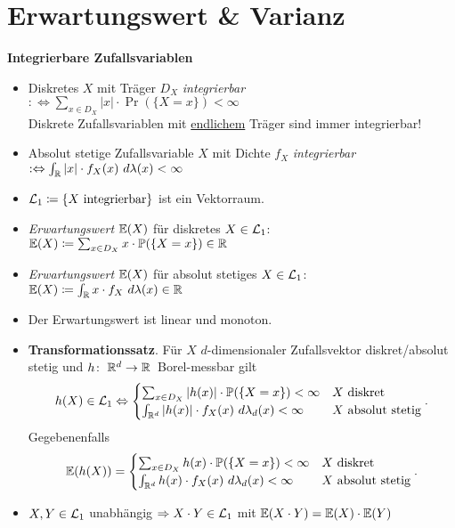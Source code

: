 \section{Erwartungswert \& Varianz}

\textbf{Integrierbare Zufallsvariablen}
\begin{itemize}
\item Diskretes $X$ mit Träger $D_X$ \textit{integrierbar}
  $:\Leftrightarrow \sum_{x \in D_X} |x| \cdot \Pr(\{X=x\}) < \infty$ \\
  Diskrete Zufallsvariablen mit \underline{endlichem} Träger sind immer
  integrierbar!

\item  Absolut stetige Zufallsvariable $X$ mit Dichte $f_X$ \textit{integrierbar}
  \mbox{$:\Leftrightarrow \int_{\mathbb{R}} |x| \cdot f_X(x)~d\lambda(x) < \infty$}

\item $\mathcal{L}_1 \coloneqq \{X \text{ integrierbar}\}$ ist ein Vektorraum.

\item \textit{Erwartungswert $\mathbb{E}(X)$} für diskretes $X\in\mathcal{L}_1$:
  $\mathbb{E}(X) \coloneqq \sum_{x \in D_X} x \cdot \mathbb{P}(\{X=x\}) \in\mathbb{R}$

\item \textit{Erwartungswert $\mathbb{E}(X)$} für absolut stetiges $X\in\mathcal{L}_1$:
  $\mathbb{E}(X) \coloneqq \int_{\mathbb{R}} x\cdot f_X~d\lambda(x) \in\mathbb{R}$

\item Der Erwartungswert ist linear und monoton.

\item \textbf{Transformationssatz}. Für $X$ $d$-dimensionaler Zufallsvektor
  diskret/absolut stetig und \mbox{$h\!:\ \mathbb{R}^d\to\mathbb{R}$ Borel-messbar} gilt
  \[
    h(X)\in\mathcal{L}_1 \Leftrightarrow
    \begin{cases}
    \sum_{x \in D_X} |h(x)| \cdot \mathbb{P}(\{X=x\}) < \infty      & X \text{ diskret}  \\
    \int_{\mathbb{R}^d} |h(x)| \cdot f_X(x)~d\lambda_d(x) < \infty   & X \text{ absolut stetig}
    \end{cases}.
  \]
  Gegebenenfalls
  \[
  	\mathbb{E}(h(X)) =
    \begin{cases}
    \sum_{x \in D_X} h(x) \cdot \mathbb{P}(\{X=x\}) < \infty			& X \text{ diskret} \\
    \int_{\mathbb{R}^d} h(x) \cdot f_X(x)~d\lambda_d(x) < \infty  & X \text{ absolut stetig}
    \end{cases}.
  \]

\item $X,Y\in\mathcal{L}_1$ unabhängig
  $\Rightarrow X \cdot Y \in\mathcal{L}_1$ mit $\mathbb{E}(X \cdot Y) = \mathbb{E}(X) \cdot \mathbb{E}(Y)$
\end{itemize}
\hspace{3em}

